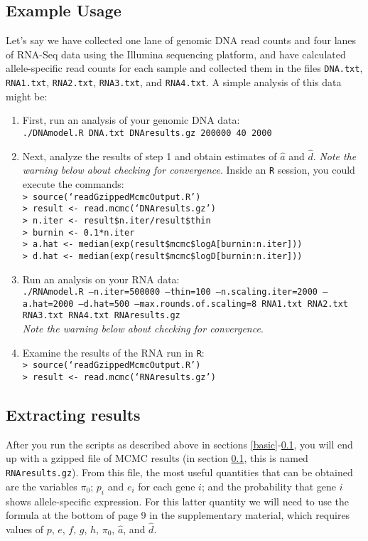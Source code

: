 \documentclass[12pt,]{article}
\begin{document}
\subsection{Example Usage} \label{example}
Let's say we have collected one lane of genomic DNA read counts and four lanes of 
RNA-Seq data using the Illumina sequencing platform, and have calculated allele-specific 
read counts for each sample and collected them in the files {\tt DNA.txt}, {\tt RNA1.txt}, 
{\tt RNA2.txt}, {\tt RNA3.txt}, and {\tt RNA4.txt}. A simple analysis of this data might be:
\begin{enumerate}
\item First, run an analysis of your genomic DNA data: \\
{\tt ./DNAmodel.R DNA.txt DNAresults.gz 200000 40 2000}
\item Next, analyze the results of step 1 and obtain estimates of $\hat{a}$ and $\hat{d}$. 
\emph{Note the warning below about checking for convergence}. Inside an {\tt R} session,
you could execute the commands: \\
{\tt > source(`readGzippedMcmcOutput.R') \\
> result <- read.mcmc(`DNAresults.gz') \\
> n.iter <- result\$n.iter/result\$thin \\
> burnin <- 0.1*n.iter \\
> a.hat <- median(exp(result\$mcmc\$logA[burnin:n.iter])) \\
> d.hat <- median(exp(result\$mcmc\$logD[burnin:n.iter])) \\
}
\item Run an analysis on your RNA data: \\
{\tt ./RNAmodel.R --n.iter=500000 --thin=100 --n.scaling.iter=2000 --a.hat=2000 --d.hat=500 
--max.rounds.of.scaling=8 RNA1.txt RNA2.txt RNA3.txt RNA4.txt RNAresults.gz} \\
\emph{Note the warning below about checking for convergence}.
\item Examine the results of the RNA run in {\tt R}: \\
{\tt > source(`readGzippedMcmcOutput.R') \\
> result <- read.mcmc(`RNAresults.gz') \\
}
\end{enumerate}

\subsection{Extracting results}
After you run the scripts as described above in sections \ref{basic}-\ref{example}, you 
will end up with a gzipped file of MCMC results (in section \ref{example}, this is named
{\tt RNAresults.gz}). From this file, the most useful quantities that can be obtained are
the variables $\pi_0$; $p_i$ and $e_i$ for each gene $i$; and the probability that gene $i$
shows allele-specific expression. For this latter quantity we will need to use the formula
at the bottom of page 9 in the supplementary material, which requires values of $p$, $e$, 
$f$, $g$, $h$, $\pi_0$, $\hat{a}$, and $\hat{d}$.
\end{document}
